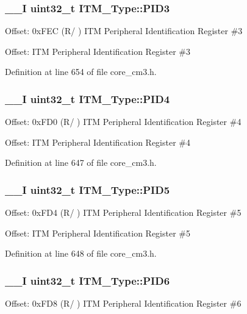 \hypertarget{struct_i_t_m___type_af006ee26c7e61c9a3712a80ac74a6cf3}{
\subsubsection[{P\-I\-D3}]{\setlength{\rightskip}{0pt plus 5cm}\-\_\-\-\_\-\-I {\bf uint32\-\_\-t} I\-T\-M\-\_\-\-Type\-::\-P\-I\-D3}}\label{struct_i_t_m___type_af006ee26c7e61c9a3712a80ac74a6cf3}
Offset\-: 0x\-F\-E\-C (R/ ) I\-T\-M Peripheral Identification Register \#3

Offset\-: I\-T\-M Peripheral Identification Register \#3 

Definition at line 654 of file core\-\_\-cm3.\-h.

\hypertarget{struct_i_t_m___type_accfc7de00b0eaba0301e8f4553f70512}{
\subsubsection[{P\-I\-D4}]{\setlength{\rightskip}{0pt plus 5cm}\-\_\-\-\_\-\-I {\bf uint32\-\_\-t} I\-T\-M\-\_\-\-Type\-::\-P\-I\-D4}}\label{struct_i_t_m___type_accfc7de00b0eaba0301e8f4553f70512}
Offset\-: 0x\-F\-D0 (R/ ) I\-T\-M Peripheral Identification Register \#4

Offset\-: I\-T\-M Peripheral Identification Register \#4 

Definition at line 647 of file core\-\_\-cm3.\-h.

\hypertarget{struct_i_t_m___type_a9353055ceb7024e07d59248e54502cb9}{
\subsubsection[{P\-I\-D5}]{\setlength{\rightskip}{0pt plus 5cm}\-\_\-\-\_\-\-I {\bf uint32\-\_\-t} I\-T\-M\-\_\-\-Type\-::\-P\-I\-D5}}\label{struct_i_t_m___type_a9353055ceb7024e07d59248e54502cb9}
Offset\-: 0x\-F\-D4 (R/ ) I\-T\-M Peripheral Identification Register \#5

Offset\-: I\-T\-M Peripheral Identification Register \#5 

Definition at line 648 of file core\-\_\-cm3.\-h.

\hypertarget{struct_i_t_m___type_a755c0ec919e7dbb5f7ff05c8b56a3383}{
\subsubsection[{P\-I\-D6}]{\setlength{\rightskip}{0pt plus 5cm}\-\_\-\-\_\-\-I {\bf uint32\-\_\-t} I\-T\-M\-\_\-\-Type\-::\-P\-I\-D6}}\label{struct_i_t_m___type_a755c0ec919e7dbb5f7ff05c8b56a3383}
Offset\-: 0x\-F\-D8 (R/ ) I\-T\-M Peripheral Identification Register \#6

